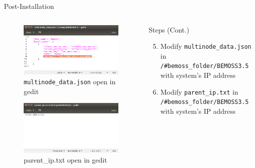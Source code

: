 \documentclass{beamer}
\begin{document}
\begin{frame}{Post-Installation}
	\begin{columns}[T]
		\begin{column}{0.5\textwidth}
			\begin{figure}
				\includegraphics[scale=0.2]{../figs/multinodeChange.png}
				\caption{\texttt{multinode\_data.json} open in gedit}
			\end{figure}
			\begin{figure}
				\includegraphics[scale=0.2]{../figs/parentipChange.png}
				\caption{parent\_ip.txt open in gedit}
			\end{figure}
		\end{column}
		\begin{column}{0.5\textwidth}
			\begin{block}{Steps (Cont.)}
				\begin{enumerate}
					\setcounter{enumi}{4}
					\item Modify \texttt{multinode\_data.json} in \texttt{/\#bemoss\_folder/BEMOSS3.5} with system's IP address
					\item Modify \texttt{parent\_ip.txt} in \texttt{/\#bemoss\_folder/BEMOSS3.5} with system's IP address
				\end{enumerate}
			\end{block}
		\end{column}
	\end{columns}
\end{frame}
\end{document}
